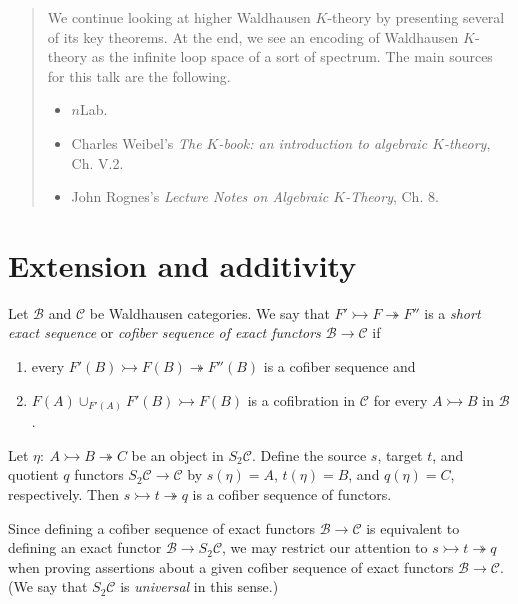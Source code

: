 \documentclass[10pt,letterpaper,cm]{nupset}
\theoremstyle{definition}
\theoremstyle{theorem}
\theoremstyle{remark}
\newcommand{\1}{\mathbf{1}}
\renewcommand{\b}{\mathscr{B}}
\renewcommand{\c}{\mathscr{C}}
\newcommand{\0}{\vec 0}
\begin{document}
\begin{abstract}
We continue looking at higher Waldhausen $K$-theory by presenting several of its key theorems. At the end, we see an encoding of Waldhausen $K$-theory as the infinite loop space of a sort of spectrum. The main sources for this talk are the following.
\begin{itemize}
\item $n$Lab.
\item Charles Weibel's \textit{The $K$-book: an introduction to algebraic $K$-theory},  Ch. V.2.
\item John Rognes's \textit{Lecture Notes on Algebraic $K$-Theory}, Ch. 8.
\end{itemize}
\end{abstract}

\smallskip

\section{Extension and additivity}

Let $\b$ and $\c$ be Waldhausen categories. We say that $F' \rightarrowtail F \twoheadrightarrow F''$ is a \textit{short exact sequence} or \textit{cofiber sequence of exact functors $\b \to \c$} if 
\begin{enumerate}[label=(\roman*)]
\item every $F'(B) \rightarrowtail F(B) \twoheadrightarrow F''(B)$ is a cofiber sequence and 
\item $F(A) \cup_{F'(A)} F'(B) \rightarrowtail F(B)$ is a cofibration in $\c$ for every $A \rightarrowtail B$ in $\b$.
\end{enumerate}


Let $\eta :\ A \rightarrowtail B \twoheadrightarrow C$ be an object in $S_2{\c}$. Define the source $s$, target $t$, and quotient $q$ functors $S_2{\c} \to \c$ by $s(\eta) = A$, $t(\eta) = B$, and $q(\eta) = C$, respectively. Then $s \rightarrowtail t \twoheadrightarrow q$ is a cofiber sequence of functors. 

Since defining a cofiber sequence of exact functors $\b \to \c$ is equivalent to defining an exact functor $\b \to S_2{\c}$, we may restrict our attention to $s \rightarrowtail t \twoheadrightarrow q$ when proving assertions about a given cofiber sequence of exact functors $\b \to \c$. (We say that $S_2{\c}$ is \textit{universal} in this sense.)
\end{document}
